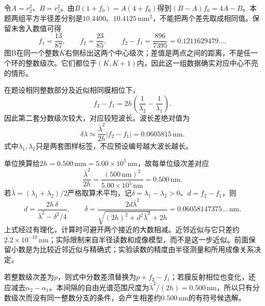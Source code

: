 \documentclass[UTF8,fontset=fandol,a4paper,11pt]{ctexart}
\newcommand{\figcaption}[1]{\par\vspace{2pt}{\small\color{muted}#1}\par}
\begin{document}
令$A=r_2^2$、$B=r_5^2$。由$B(1+f_0)=A(4+f_0)$得到$(B-A)f_0=4A-B$。本题两组平方半径差分别是$10.4400$、$10.4125\,\mathrm{mm^2}$，不能把两个差先取成相同值。保留未舍入数值可得
\[
f_1=\frac{13}{87},\qquad f_2=\frac{23}{85},\qquad
f_2-f_1=\frac{896}{7395}=0.1211629479\ldots .
\]
图B在同一个整数$K$右侧标出这两个中心级次；差值是两点之间的距离，不是任一个环的整数级次。它们都位于$(K,K+1)$内，因此这一组数据确实对应中心不亮的情形。

\begin{center}\begin{minipage}{.98\linewidth}\centering
{}
\figcaption{解图光2.20B\quad 同一整数级次内的两个分数部分}
\end{minipage}\end{center}
在题设相同整数部分及近似相同膜相位下，
\[
f_2-f_1=2h\left(\frac1{\lambda_2}-\frac1{\lambda_1}\right).
\]
因此第二套分数级次较大，对应较短波长。波长差绝对值为
\[
\boxed{\delta\lambda\simeq
\frac{\bar\lambda^2}{2h}|f_2-f_1|
=0.0605815\,\mathrm{nm}}.
\]
式中$\lambda_1,\lambda_2$只是两套图样标签，不应预设编号越大波长越长。

单位换算给$2h=0.500\,\mathrm{mm}=5.00\times10^5\,\mathrm{nm}$，故每单位级次差对应
\[
\frac{\bar\lambda^2}{2h}=
\frac{(500\,\mathrm{nm})^2}{5.00\times10^5\,\mathrm{nm}}
=0.500\,\mathrm{nm}.
\]
若$\bar\lambda=(\lambda_1+\lambda_2)/2$严格取算术平均，记$\delta=\lambda_1-\lambda_2>0$、$d=f_2-f_1$，则
\[
d=\frac{2h\,\delta}{\bar\lambda^2-\delta^2/4},\qquad
\delta=\frac{2d\bar\lambda^2}
{\sqrt{(2h)^2+d^2\bar\lambda^2}+2h}
=0.06058147375\ldots\,\mathrm{nm}.
\]
上式经过有理化，计算时可避开两个接近的大数相减。近邻近似与它只差约$2.2\times10^{-10}\,\mathrm{nm}$；实际限制来自半径读数和成像模型，而不是这一步近似。前面保留小数是为比较近邻近似与精确式；实验读数的精度由半径测量和所用成像关系决定。


若整数级次差为$p$，则式中分数差须替换为$p+f_2-f_1$；若膜反射相位也变化，还应减去$\alpha_2-\alpha_1$。本间隔的自由光谱范围尺度为$\bar\lambda^2/(2h)=0.500\,\mathrm{nm}$，所以只有分数级次而没有同一整数分支的条件，会产生相差约$0.500\,\mathrm{nm}$的有符号候选解。
\end{document}
